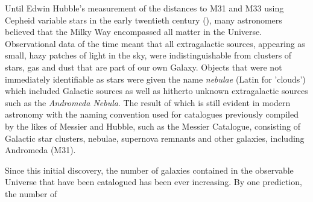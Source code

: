 Until Edwin Hubble's measurement of the distances to M31 and M33 using Cepheid variable stars in the early twentieth century (\citealt{Hubble_1925}), many astronomers believed that the Milky Way encompassed all matter in the Universe. Observational data of the time meant that all extragalactic sources, appearing as small, hazy patches of light in the sky, were indistinguishable from clusters of stars, gas and dust that are part of our own Galaxy. Objects that were not immediately identifiable as stars were given the name \textit{nebulae} (Latin for 'clouds') which included Galactic sources as well as hitherto unknown extragalactic sources such as the \textit{Andromeda Nebula}. The result of which is still evident in modern astronomy with the naming convention used for catalogues previously compiled by the likes of Messier and Hubble, such as the Messier Catalogue, consisting of Galactic star clusters, nebulae, supernova remnants and other galaxies, including Andromeda (M31).

Since this initial discovery, the number of galaxies contained in the observable Universe that have been catalogued has been ever increasing. By one prediction, the number of 